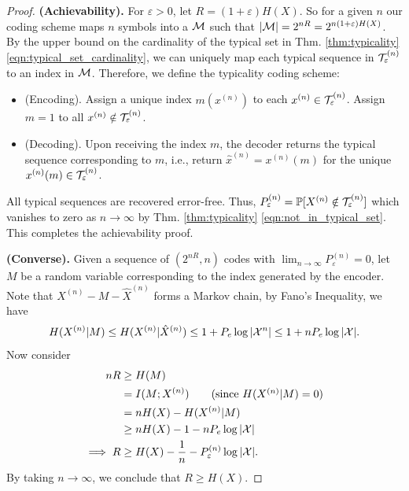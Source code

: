 \documentclass[11pt,a4paper]{article}
\begin{document}
\begin{proof}
    \textbf{(Achievability).} For $\varepsilon > 0$, let $R = (1+\varepsilon)H(X)$.  So for a given $n$ our coding scheme maps $n$ symbols into a $\mathcal{M}$ such that $|\mathcal{M}| = 2^{nR} = 2^{n(1+\varepsilon)H(X)}$. By the upper bound on the cardinality of the typical set in Thm. \ref{thm:typicality} \eqref{eqn:typical_set_cardinality}, we can uniquely map each typical sequence in $\mathcal{T}^{(n)}_\varepsilon$ to an index in $\mathcal{M}$. Therefore, we define the typicality coding scheme:
    \begin{itemize}
        \item {(Encoding).} Assign a unique index $m(x^{(n)})$ to each $x^{(n)}\in\mathcal{T}^{(n)}_\varepsilon$. Assign $m = 1$ to all $x^{(n)}\notin \mathcal{T}^{(n)}_\varepsilon$. 
        \item {(Decoding).} Upon receiving the index $m$, the decoder returns the typical sequence corresponding to $m$, i.e., return $\hat{x}^{(n)} = x^{(n)}(m)$ for the unique $x^{(n)}(m)\in\mathcal{T}^{(n)}_\varepsilon$.
    \end{itemize}

    \noindent All typical sequences are recovered error-free. Thus, $P^{(n)}_\varepsilon = \mathbb{P}[X^{(n)}\notin\mathcal{T}^{(n)}_\varepsilon]$ which vanishes to zero as $n\rightarrow \infty$ by Thm. \ref{thm:typicality} \eqref{eqn:not_in_typical_set}. This completes the achievability proof.

    \noindent \textbf{(Converse).} Given a sequence of $(2^{nR},n)$ codes with $\lim_{n\rightarrow \infty} P^{(n)}_\varepsilon = 0$, let $M$ be a random variable corresponding to the index generated by the encoder. Note that $X^{(n)} - M - \hat{X}^{(n)}$ forms a Markov chain, by Fano's Inequality, we have
    \begin{equation*}
        H(X^{(n)}|M) \le H(X^{(n)}|\hat{X}^{(n)}) \le 1 + P_e \log|\mathcal{X}^n|\le 1 + nP_e\log|\mathcal{X}|.
    \end{equation*}
    Now consider 
    \begin{align*}
        nR &\ge H(M) \\
        &= I(M;X^{(n)})\tag{since $H(X^{(n)}|M) = 0$} \\
        &= nH(X) - H(X^{(n)}|M) \\
        &\ge nH(X) - 1 - nP_e\log|\X|\\
        \implies R &\ge H(X) - \dfrac{1}{n} - P^{(n)}_\varepsilon\log|\X|.
    \end{align*}
    By taking $n\rightarrow \infty$, we conclude that $R\ge H(X)$.
\end{proof}
\end{document}
